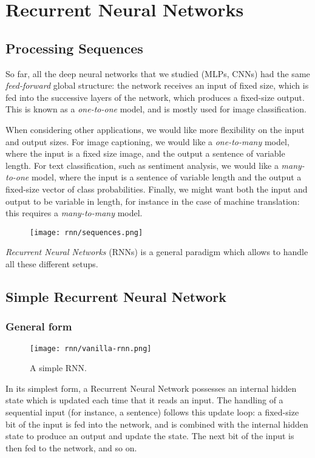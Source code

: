 \section{Recurrent Neural Networks}
\subsection{Processing Sequences}
So far, all the deep neural networks that we studied (MLPs, CNNs) had the same \emph{feed-forward} global structure: the network receives an input of fixed size, which is fed into the successive layers of the network, which produces a fixed-size output. This is known as a \emph{one-to-one} model, and is mostly used for image classification.

When considering other applications, we would like more flexibility on the input and output sizes. For image captioning, we would like a \emph{one-to-many} model, where the input is a fixed size image, and the output a sentence of variable length. For text classification, such as sentiment analysis, we would like a \emph{many-to-one} model, where the input is a sentence of variable length and the output a fixed-size vector of class probabilities. Finally, we might want both the input and output to be variable in length, for instance in the case of machine translation: this requires a \emph{many-to-many} model.

\begin{figure}[H]
    \centering
    \texttt{[image: rnn/sequences.png]}
\end{figure}

\emph{Recurrent Neural Networks} (RNNs) is a general paradigm which allows to handle all these different setups.

\subsection{Simple Recurrent Neural Network}
\subsubsection{General form}
\begin{wrapfigure}{r}{0.2\textwidth}
    \centering
    \texttt{[image: rnn/vanilla-rnn.png]}
    \caption{A simple RNN.}
\end{wrapfigure}
In its simplest form, a Recurrent Neural Network possesses an internal hidden state which is updated each time that it reads an input. The handling of a sequential input (for instance, a sentence) follows this update loop: a fixed-size bit of the input is fed into the network, and is combined with the internal hidden state to produce an output and update the state. The next bit of the input is then fed to the network, and so on.

